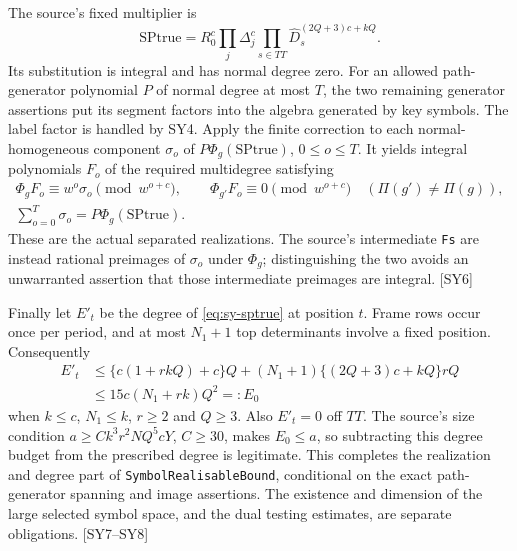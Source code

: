 The source's fixed multiplier is
\begin{equation}\label{eq:sy-sptrue}
\mathrm{SPtrue}=R_0^c\prod_j\Delta_j^c
                    \prod_{s\in TT}\widehat D_s^{(2Q+3)c+kQ}.
\end{equation}
Its substitution is integral and has normal degree zero. For an allowed path-generator polynomial $P$ of normal degree at most $T$, the two remaining generator assertions put its segment factors into the algebra generated by key symbols. The label factor is handled by SY4. Apply the finite correction to each normal-homogeneous component $\sigma_o$ of $P\Phi_g(\mathrm{SPtrue})$, $0\le o\le T$. It yields integral polynomials $F_o$ of the required multidegree satisfying
\begin{gather*}
\Phi_gF_o\equiv w^o\sigma_o\pmod {w^{o+c}},\qquad
\Phi_{g'}F_o\equiv0\pmod {w^{o+c}}\quad(\Pi(g')\ne\Pi(g)),\\
\sum_{o=0}^T\sigma_o=P\Phi_g(\mathrm{SPtrue}).
\end{gather*}
These are the actual separated realizations. The source's intermediate \texttt{Fs} are instead rational preimages of $\sigma_o$ under $\Phi_g$; distinguishing the two avoids an unwarranted assertion that those intermediate preimages are integral. \textsf{[SY6]}

Finally let $E'_t$ be the degree of \eqref{eq:sy-sptrue} at position $t$. Frame rows occur once per period, and at most $N_1+1$ top determinants involve a fixed position. Consequently
\begin{align*}
E'_t&\le\{c(1+rkQ)+c\}Q
 +(N_1+1)\{(2Q+3)c+kQ\}rQ\\
&\le15c(N_1+rk)Q^2=:E_0
\end{align*}
when $k\le c$, $N_1\le k$, $r\ge2$ and $Q\ge3$. Also $E'_t=0$ off $TT$. The source's size condition $a\ge Ck^3r^2NQ^5cY$, $C\ge30$, makes $E_0\le a$, so subtracting this degree budget from the prescribed degree is legitimate. This completes the realization and degree part of \texttt{SymbolRealisableBound}, conditional on the exact path-generator spanning and image assertions. The existence and dimension of the large selected symbol space, and the dual testing estimates, are separate obligations. \textsf{[SY7--SY8]}
